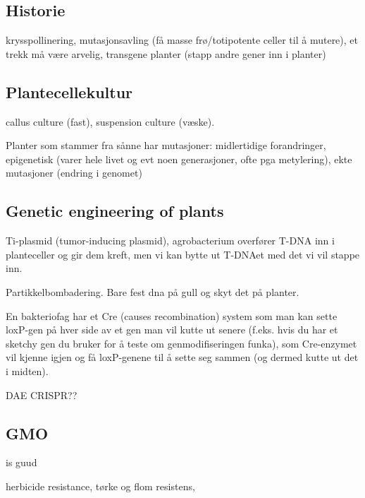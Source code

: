 \subsection{Historie}
    krysspollinering,
    mutasjonsavling (få masse frø/totipotente celler til å mutere),
    et trekk må være arvelig,
    transgene planter (stapp andre gener inn i planter)

\subsection{Plantecellekultur}
    callus culture (fast),
    suspension culture (væske).

    Planter som stammer fra sånne har mutasjoner: 
    midlertidige forandringer,
    epigenetisk (varer hele livet og evt noen generasjoner, ofte pga metylering),
    ekte mutasjoner (endring i genomet)

\subsection{Genetic engineering of plants}
    Ti-plasmid (tumor-inducing plasmid), agrobacterium overfører T-DNA inn i planteceller og gir dem kreft, 
    men vi kan bytte ut T-DNAet med det vi vil stappe inn.

    Partikkelbombadering. Bare fest dna på gull og skyt det på planter.

    En bakteriofag har et Cre (causes recombination) system som man kan sette loxP-gen på hver side av et gen man vil kutte ut senere 
    (f.eks. hvis du har et sketchy gen du bruker for å teste om genmodifiseringen funka), som Cre-enzymet vil kjenne igjen 
    og få loxP-genene til å sette seg sammen (og dermed kutte ut det i midten).
    

    DAE CRISPR??

\subsection{GMO}
    is guud

    herbicide resistance, tørke og flom resistens, 
